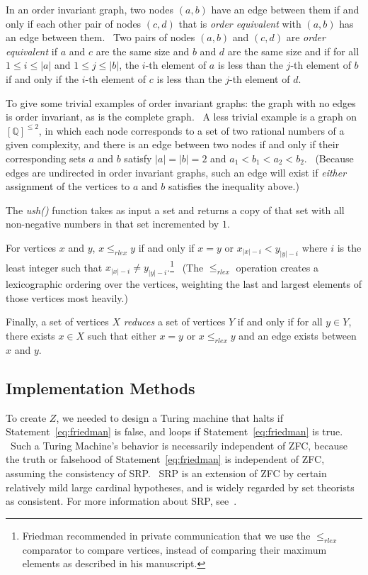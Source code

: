 \documentclass[11pt]{article}
\begin{document}
In an order invariant graph, two nodes $(a,b)$ have an edge between them if and only if each other pair of nodes $(c,d)$ that is \emph{order equivalent} with $(a,b)$ has an edge between them. \ Two pairs of nodes $(a, b)$ and $(c, d)$ are \emph{order equivalent} if $a$ and $c$ are the same size and $b$ and $d$ are the same size and if for all $1 \le i \le |a|$ and $1 \le j \le |b|$, the $i$-th element of $a$ is less than the $j$-th element of $b$ if and only if the $i$-th element of $c$ is less than the $j$-th element of $d$.

To give some trivial examples of order invariant graphs: the graph with no edges is order invariant, as is the complete graph. \ A less trivial example is a graph on $[\mathbb{Q}]^{\le 2}$, in which each node corresponds to a set of two rational numbers of a given complexity, and there is an edge between two nodes if and only if their corresponding sets $a$ and $b$ satisfy $|a| = |b| = 2$ and $a_1 < b_1 < a_2 < b_2$. \ (Because edges are undirected in order invariant graphs, such an edge will exist if \emph{either} assignment of the vertices to $a$ and $b$ satisfies the inequality above.)

The \emph{ush()} function takes as input a set and returns a copy of that set with all non-negative numbers in that set incremented by $1$.

For vertices $x$ and $y$, $x \le_{rlex} y$ if and only if $x = y$ or $x_{|x|-i} < y_{|y|-i}$ where $i$ is the least integer such that $x_{|x|-i} \not= y_{|y|-i}$.\footnote{Friedman recommended in private communication that we use the $\le_{rlex}$ comparator to compare vertices, instead of comparing their maximum elements as described in his manuscript.} \ (The $\le_{rlex}$ operation creates a lexicographic ordering over the vertices, weighting the last and largest elements of those vertices most heavily.)

Finally, a set of vertices $X$ \emph{reduces} a set of vertices $Y$ if and only if for all $y \in Y$, there exists $x \in X$ such that
either $x = y$ or $x \le_{rlex} y$ and an edge exists between $x$ and $y$.

\subsection{Implementation Methods}

To create $Z$, we needed to design a Turing machine that halts if Statement~\ref{eq:friedman} is false, and loops if Statement~\ref{eq:friedman} is true. \ Such a Turing Machine's behavior is necessarily independent of ZFC, because the truth or falsehood of Statement~\ref{eq:friedman} is independent of ZFC, assuming the consistency of SRP.~\cite{friedman} SRP is an extension of ZFC by certain relatively mild large cardinal hypotheses, and is widely regarded by set theorists as consistent. For more information about SRP, see~\cite{srp}.
\end{document}
